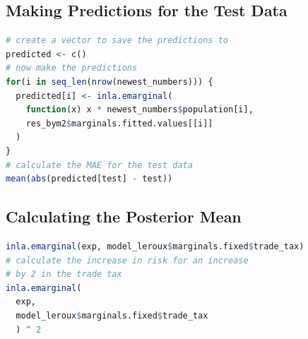 \subsection{Making Predictions for the Test Data}
\begin{lstlisting}[caption={The code for making predictions in INLA.}, label={codePrediction}, language=R]
# create a vector to save the predictions to
predicted <- c()
# now make the predictions
for(i in seq_len(nrow(newest_numbers))) {
  predicted[i] <- inla.emarginal(
    function(x) x * newest_numbers$population[i],
    res_bym2$marginals.fitted.values[[i]]
  )
}
# calculate the MAE for the test data
mean(abs(predicted[test] - test))

\end{lstlisting}
\subsection{Calculating the Posterior Mean}
\begin{lstlisting}[caption={Calculating the posterior mean of a coefficent.}, label={codePosteriorMean}, language=R]
inla.emarginal(exp, model_leroux$marginals.fixed$trade_tax)
# calculate the increase in risk for an increase 
# by 2 in the trade tax
inla.emarginal(
  exp,
  model_leroux$marginals.fixed$trade_tax
  ) ^ 2
\end{lstlisting}
